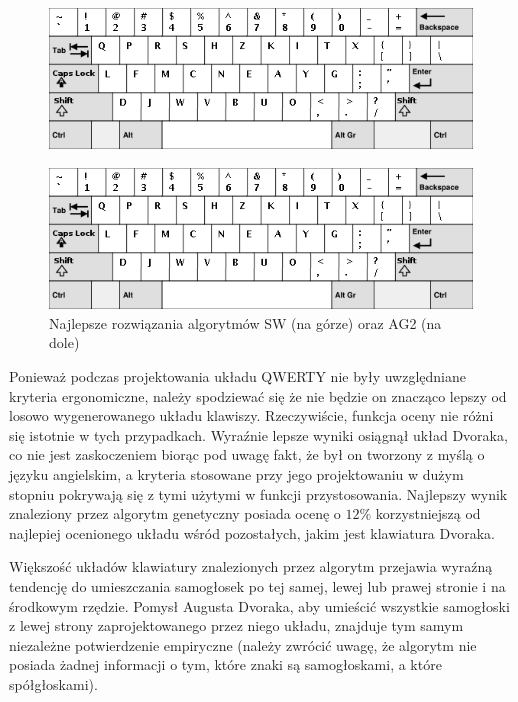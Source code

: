 \documentclass{xmgr}
\begin{document}
\begin{figure}[!tbh]
\centering
\includegraphics[width=.7\hsize]{fig/sw_en}
\end{figure}
\begin{figure}[!tbh]
\centering
\includegraphics[width=.7\hsize]{fig/ag2_en}
\caption{Najlepsze rozwiązania algorytmów SW (na górze) oraz AG2 (na dole)}
\end{figure}

Ponieważ podczas projektowania układu QWERTY nie były uwzględniane kryteria ergonomiczne, należy spodziewać się że nie będzie on znacząco lepszy od losowo wygenerowanego układu klawiszy. Rzeczywiście, funkcja oceny nie różni się istotnie w tych przypadkach. Wyraźnie lepsze wyniki osiągnął układ Dvoraka, co nie jest zaskoczeniem biorąc pod uwagę fakt, że był on tworzony z myślą o języku angielskim, a kryteria stosowane przy jego projektowaniu w dużym stopniu pokrywają się z tymi użytymi w funkcji przystosowania. Najlepszy wynik znaleziony przez algorytm genetyczny posiada ocenę o $12\%$ korzystniejszą od najlepiej ocenionego układu wśród pozostałych, jakim jest klawiatura Dvoraka.

Większość układów klawiatury znalezionych przez algorytm przejawia wyraźną tendencję do umieszczania samogłosek po tej samej, lewej lub prawej stronie i na środkowym rzędzie. Pomysł Augusta Dvoraka, aby umieścić wszystkie samogłoski z lewej strony zaprojektowanego przez niego układu, znajduje tym samym niezależne potwierdzenie empiryczne (należy zwrócić uwagę, że algorytm nie posiada żadnej informacji o tym, które znaki są samogłoskami, a które spółgłoskami).
\end{document}
